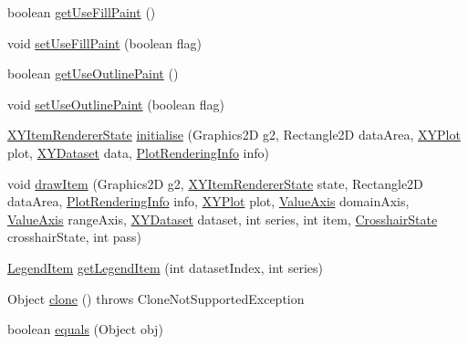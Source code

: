 \begin{DoxyCompactItemize}
\item 
boolean \mbox{\hyperlink{classorg_1_1jfree_1_1chart_1_1renderer_1_1xy_1_1_x_y_line_and_shape_renderer_a8bd7907c3f07dbe4495fd3f0d7a7e4d4}{get\+Use\+Fill\+Paint}} ()
\item 
void \mbox{\hyperlink{classorg_1_1jfree_1_1chart_1_1renderer_1_1xy_1_1_x_y_line_and_shape_renderer_a10b363b55780c53c8aff57f0f4bcc3f6}{set\+Use\+Fill\+Paint}} (boolean flag)
\item 
boolean \mbox{\hyperlink{classorg_1_1jfree_1_1chart_1_1renderer_1_1xy_1_1_x_y_line_and_shape_renderer_a4c0299cee69c99c4a119ff4e945e0b3d}{get\+Use\+Outline\+Paint}} ()
\item 
void \mbox{\hyperlink{classorg_1_1jfree_1_1chart_1_1renderer_1_1xy_1_1_x_y_line_and_shape_renderer_a2cea4417beb098e96e8f15c7268d5ad7}{set\+Use\+Outline\+Paint}} (boolean flag)
\item 
\mbox{\hyperlink{classorg_1_1jfree_1_1chart_1_1renderer_1_1xy_1_1_x_y_item_renderer_state}{X\+Y\+Item\+Renderer\+State}} \mbox{\hyperlink{classorg_1_1jfree_1_1chart_1_1renderer_1_1xy_1_1_x_y_line_and_shape_renderer_a48088d03f5e68ef87da30708f85cb9d9}{initialise}} (Graphics2D g2, Rectangle2D data\+Area, \mbox{\hyperlink{classorg_1_1jfree_1_1chart_1_1plot_1_1_x_y_plot}{X\+Y\+Plot}} plot, \mbox{\hyperlink{interfaceorg_1_1jfree_1_1data_1_1xy_1_1_x_y_dataset}{X\+Y\+Dataset}} data, \mbox{\hyperlink{classorg_1_1jfree_1_1chart_1_1plot_1_1_plot_rendering_info}{Plot\+Rendering\+Info}} info)
\item 
void \mbox{\hyperlink{classorg_1_1jfree_1_1chart_1_1renderer_1_1xy_1_1_x_y_line_and_shape_renderer_a1debfa7e11a81ba8dc7f8ae4ea41383b}{draw\+Item}} (Graphics2D g2, \mbox{\hyperlink{classorg_1_1jfree_1_1chart_1_1renderer_1_1xy_1_1_x_y_item_renderer_state}{X\+Y\+Item\+Renderer\+State}} state, Rectangle2D data\+Area, \mbox{\hyperlink{classorg_1_1jfree_1_1chart_1_1plot_1_1_plot_rendering_info}{Plot\+Rendering\+Info}} info, \mbox{\hyperlink{classorg_1_1jfree_1_1chart_1_1plot_1_1_x_y_plot}{X\+Y\+Plot}} plot, \mbox{\hyperlink{classorg_1_1jfree_1_1chart_1_1axis_1_1_value_axis}{Value\+Axis}} domain\+Axis, \mbox{\hyperlink{classorg_1_1jfree_1_1chart_1_1axis_1_1_value_axis}{Value\+Axis}} range\+Axis, \mbox{\hyperlink{interfaceorg_1_1jfree_1_1data_1_1xy_1_1_x_y_dataset}{X\+Y\+Dataset}} dataset, int series, int item, \mbox{\hyperlink{classorg_1_1jfree_1_1chart_1_1plot_1_1_crosshair_state}{Crosshair\+State}} crosshair\+State, int pass)
\item 
\mbox{\hyperlink{classorg_1_1jfree_1_1chart_1_1_legend_item}{Legend\+Item}} \mbox{\hyperlink{classorg_1_1jfree_1_1chart_1_1renderer_1_1xy_1_1_x_y_line_and_shape_renderer_a28b44117b28d6414adbc8184e7756c95}{get\+Legend\+Item}} (int dataset\+Index, int series)
\item 
Object \mbox{\hyperlink{classorg_1_1jfree_1_1chart_1_1renderer_1_1xy_1_1_x_y_line_and_shape_renderer_ac0ce9612ffcb7c7069c594eb101cbb4c}{clone}} ()  throws Clone\+Not\+Supported\+Exception 
\item 
boolean \mbox{\hyperlink{classorg_1_1jfree_1_1chart_1_1renderer_1_1xy_1_1_x_y_line_and_shape_renderer_ab5c98941e77cd2da6de5e7c4056da3d4}{equals}} (Object obj)
\end{DoxyCompactItemize}
